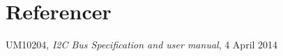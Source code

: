 \chapter{Referencer}

\begin{thebibliography}{9}
	
	UM10204,
	\textit{I2C Bus Specification and user manual}, 4 April 2014
	
	\end{thebibliography}